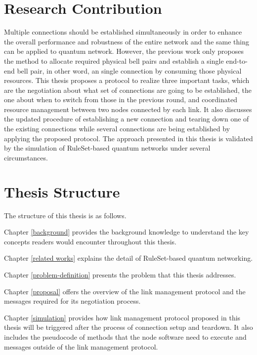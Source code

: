\section{Research Contribution}
\label{introduction:research-contribution}

Multiple connections should be established simultaneously in order to enhance the overall performance and robustness of the entire network and the same thing can be applied to quantum network. 
However, the previous work only proposes the method to allocate required physical bell pairs and establish a single end-to-end bell pair, in other word, an single connection by consuming those physical resources.
This thesis proposes a protocol to realize three important tasks, which are the negotiation about what set of connections are going to be established, the one about when to switch from those in the previous round, and coordinated resource management between two nodes connected by each link.
It also discusses the updated procedure of establishing a new connection and tearing down one of the existing connections while several connections are being established by applying the proposed protocol.
The approach presented in this thesis is validated by the simulation of RuleSet-based quantum networks under several circumstances.

\section{Thesis Structure}
\label{introduction:thesis-structure} 

The structure of this thesis is as follows. 

Chapter \ref{background} provides the background knowledge to understand the key concepts readers would encounter throughout this thesis.

Chapter \ref{related works} explains the detail of RuleSet-based quantum networking.

Chapter \ref{problem-definition} presents the problem that this thesis addresses.

Chapter \ref{proposal} offers the overview of the link management protocol and the messages required for its negotiation process.

Chapter \ref{simulation} provides how link management protocol proposed in this thesis will be triggered after the process of connection setup and teardown. It also includes the pseudocode of methods that the node software need to execute and messages outside of the link management protocol.

